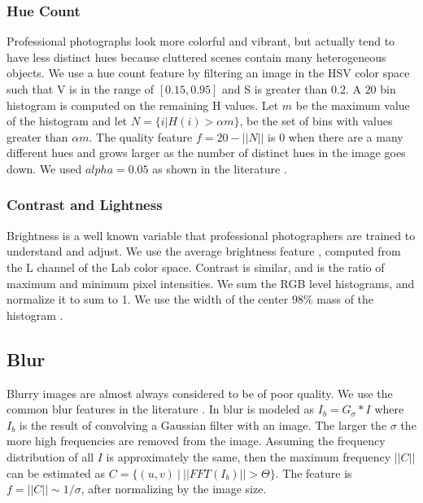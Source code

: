 \documentclass[conference,a4paper]{IEEEtran}
\begin{document}
  \subsubsection{Hue Count}
  Professional photographs look more colorful and vibrant, but actually tend to have less distinct hues because cluttered scenes contain many heterogeneous objects.  We use a hue count feature by filtering an image in the HSV color space such that V is in the range of $[0.15, 0.95]$ and S is greater than $0.2$.  A $20$ bin histogram is computed on the remaining H values.  Let $m$ be the maximum value of the histogram and let $N = \{i | H(i) > \alpha m\}$, be the set of bins with values greater than $\alpha m$.  The quality feature $f = 20 - ||N||$ is $0$ when there are a many different hues and grows larger as the number of distinct hues in the image goes down.  We used $alpha = 0.05$ as shown in the literature \cite{ke2006design}.

  \subsubsection{Contrast and Lightness}
  Brightness is a well known variable that professional photographers are trained to understand and adjust.  We use the average brightness feature \cite{ke2006design}, \cite{chen2014aesthetic} computed from the L channel of the Lab color space.  Contrast is similar, and is the ratio of maximum and minimum pixel intensities.  We sum the RGB level histograms, and normalize it to sum to 1.  We use the width of the center $98\%$ mass of the histogram \cite{ke2006design}.

   \subsection{Blur}
  Blurry images are almost always considered to be of poor quality.  We use the common blur features in the literature \cite{ke2006design} \cite{tong2004blur}.  In \cite{ke2006design} blur is modeled as $I_b = G_\sigma * I$ where $I_b$ is the result of convolving a Gaussian filter with an image.  The larger the $\sigma$ the more high frequencies are removed from the image.  Assuming the frequency distribution of all $I$ is approximately the same, then the maximum frequency $||C||$ can be estimated as $C = \{(u, v)\ |\ ||FFT(I_b)|| > \Theta\}$.  The feature is $f = ||C|| \sim 1/\sigma$, after normalizing by the image size.
\end{document}
